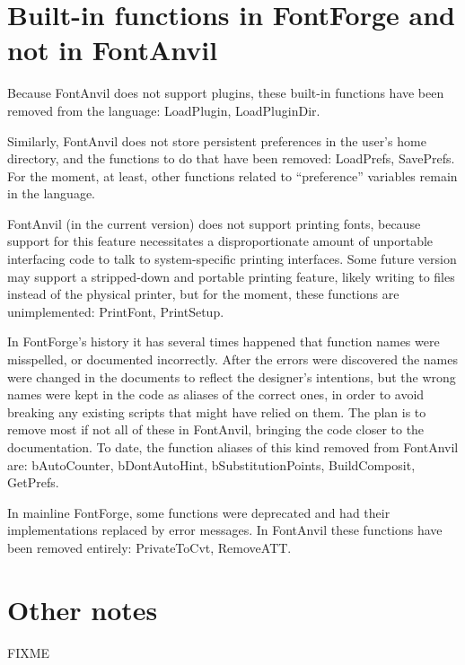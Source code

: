 \section{Built-in functions in FontForge and not in FontAnvil}

Because FontAnvil does not support plugins, these built-in functions have
been removed from the language:  LoadPlugin, LoadPluginDir.

Similarly, FontAnvil does not store persistent preferences in the user's
home directory, and the functions to do that have been removed: LoadPrefs,
SavePrefs.  For the moment, at least, other functions related to
``preference'' variables remain in the language.

FontAnvil (in the current version) does not support printing fonts, because
support for this feature necessitates a disproportionate amount of
unportable interfacing code to talk to system-specific printing interfaces. 
Some future version may support a stripped-down and portable printing
feature, likely writing to files instead of the physical printer, but for
the moment, these functions are unimplemented:  PrintFont, PrintSetup.

In FontForge's history it has several times happened that function names
were misspelled, or documented incorrectly.  After the errors were
discovered the names were changed in the documents to reflect the designer's
intentions, but the wrong names were kept in the code as aliases of the
correct ones, in order to avoid breaking any existing scripts that might
have relied on them.  The plan is to remove most if not all of these in
FontAnvil, bringing the code closer to the documentation.  To date, the
function aliases of this kind removed from FontAnvil are: bAutoCounter,
bDontAutoHint, bSubstitutionPoints, BuildComposit, GetPrefs.

In mainline FontForge, some functions were deprecated and had their
implementations replaced by error messages.  In FontAnvil these functions
have been removed entirely:  PrivateToCvt, RemoveATT.

\section{Other notes}

FIXME

